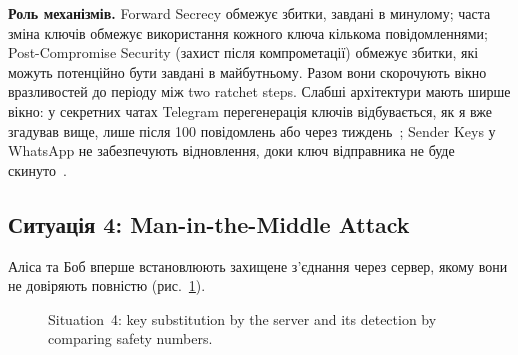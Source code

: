 \textbf{Роль механізмів.} Forward Secrecy обмежує збитки, завдані в минулому; часта зміна ключів обмежує використання 
кожного ключа кількома повідомленнями; Post-Compromise Security (захист після компрометації) обмежує збитки, які 
можуть потенційно бути завдані в майбутньому. Разом вони скорочують вікно вразливостей до періоду між two ratchet 
steps. Слабші архітектури мають ширше вікно: у секретних чатах Telegram перегенерація ключів відбувається, як я вже 
згадував вище, лише після 100 повідомлень або через тиждень~\cite{telegram_e2e}; Sender Keys у WhatsApp не забезпечують 
відновлення, доки ключ відправника не буде скинуто~\cite{whatsapp_whitepaper}.

\subsection{Ситуація 4: Man-in-the-Middle Attack}
\label{sec:s4}

Аліса та Боб вперше встановлюють захищене з’єднання через сервер, якому вони не довіряють повністю (рис.~\ref{fig:s4}).

\begin{figure}[H]
    \centering
    \caption{Situation~4: key substitution by the server and its detection by comparing safety numbers.}
    \label{fig:s4}
\end{figure}


